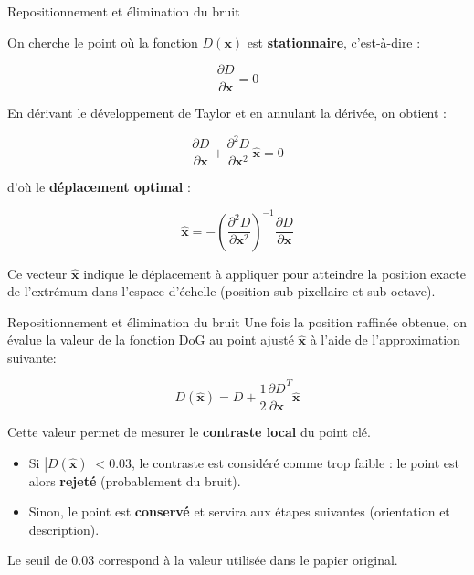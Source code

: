 \documentclass{beamer}
\begin{document}
\begin{frame}{Repositionnement et élimination du bruit}

On cherche le point où la fonction $D(\mathbf{x})$ est \textbf{stationnaire}, c’est-à-dire :

\[
\frac{\partial D}{\partial \mathbf{x}} = 0
\]

En dérivant le développement de Taylor et en annulant la dérivée, on obtient :

\[
\frac{\partial D}{\partial \mathbf{x}} + 
\frac{\partial^{2} D}{\partial \mathbf{x}^{2}} \, \hat{\mathbf{x}} = 0
\]

d’où le \textbf{déplacement optimal} :

\[
\hat{\mathbf{x}} = 
- \left( 
\frac{\partial^{2} D}{\partial \mathbf{x}^{2}} 
\right)^{-1} 
\frac{\partial D}{\partial \mathbf{x}}
\]

\vspace{0.4cm}

Ce vecteur $\hat{\mathbf{x}}$ indique le déplacement à appliquer pour atteindre 
la position exacte de l’extrémum dans l’espace d’échelle 
(position sub-pixellaire et sub-octave).

\end{frame}

\begin{frame}{Repositionnement et élimination du bruit}
Une fois la position raffinée obtenue, on évalue la valeur de la fonction DoG 
au point ajusté $\hat{\mathbf{x}}$ à l’aide de l’approximation suivante:

\[
D(\hat{\mathbf{x}}) = D + 
\frac{1}{2} 
\frac{\partial D}{\partial \mathbf{x}}^{T} 
\hat{\mathbf{x}}
\]

\vspace{0.4cm}

Cette valeur permet de mesurer le \textbf{contraste local} du point clé.

\begin{itemize}
    \item Si $\left| D(\hat{\mathbf{x}}) \right| < 0.03$, 
    le contraste est considéré comme trop faible :
    le point est alors \textbf{rejeté} (probablement du bruit).
    \item Sinon, le point est \textbf{conservé} et servira aux étapes suivantes 
    (orientation et description).
\end{itemize}

\vspace{0.4cm}

Le seuil de $0.03$ correspond à la valeur utilisée dans le papier original.

\end{frame}
\end{document}
